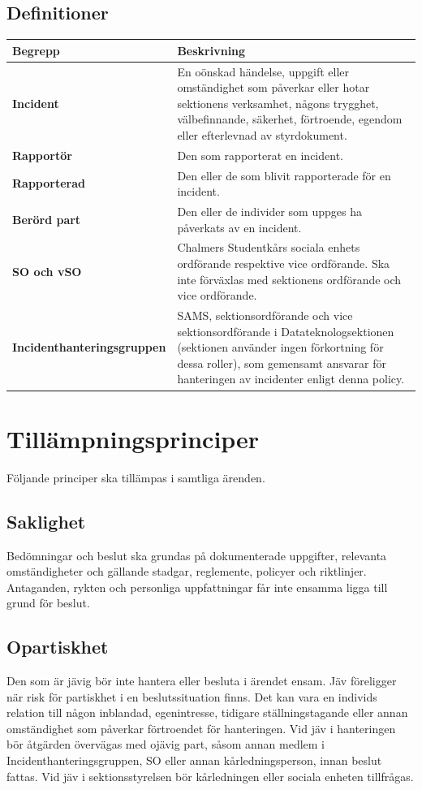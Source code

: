 \subsection{Definitioner}
\begin{center}
\renewcommand{\arraystretch}{1.35}
\begin{tabular}{@{}>{\bfseries}p{3.2cm} p{10.8cm}@{}}
\toprule
\rowcolor{headshade}\textbf{Begrepp} & \textbf{Beskrivning} \\
\midrule
Incident & En oönskad händelse, uppgift eller omständighet som påverkar eller hotar sektionens verksamhet, någons trygghet, välbefinnande, säkerhet, förtroende, egendom eller efterlevnad av styrdokument. \\
Rapportör & Den som rapporterat en incident. \\
Rapporterad & Den eller de som blivit rapporterade för en incident. \\
Berörd part & Den eller de individer som uppges ha påverkats av en incident. \\
SO och vSO & Chalmers Studentkårs sociala enhets ordförande respektive vice ordförande. Ska inte förväxlas med sektionens ordförande och vice ordförande. \\
Incident\-han\-ter\-ings\-grup\-pen & SAMS, sektionsordförande och vice sektionsordförande i Datateknologsektionen (sektionen använder ingen förkortning för dessa roller), som gemensamt ansvarar för hanteringen av incidenter enligt denna policy. \\
\bottomrule
\end{tabular}
\end{center}

\section{Tillämpningsprinciper}
Följande principer ska tillämpas i samtliga ärenden.

\subsection{Saklighet}
Bedömningar och beslut ska grundas på dokumenterade uppgifter, relevanta omständigheter och gällande stadgar, reglemente, policyer och riktlinjer. Antaganden, rykten och personliga uppfattningar får inte ensamma ligga till grund för beslut.

\subsection{Opartiskhet}
Den som är jävig bör inte hantera eller besluta i ärendet ensam. Jäv föreligger när risk för partiskhet i en beslutssituation finns. Det kan vara en individs relation till någon inblandad, egenintresse, tidigare ställningstagande eller annan omständighet som påverkar förtroendet för hanteringen. Vid jäv i hanteringen bör åtgärden övervägas med ojävig part, såsom annan medlem i Incidenthanteringsgruppen, SO eller annan kårledningsperson, innan beslut fattas. Vid jäv i sektionsstyrelsen bör kårledningen eller sociala enheten tillfrågas.


